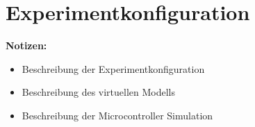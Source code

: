 \section{Experimentkonfiguration}\label{section:prototypische-implementierung:experimentkonfiguration}

\begin{note}
    \textbf{Notizen:}
    \begin{itemize}
        \item Beschreibung der Experimentkonfiguration
        \item Beschreibung des virtuellen Modells
        \item Beschreibung der Microcontroller Simulation
    \end{itemize}
\end{note}